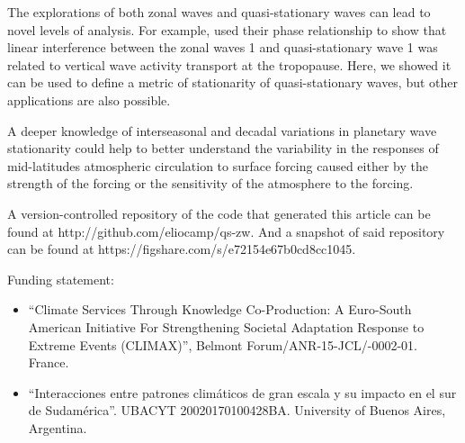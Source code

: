 \documentclass[draft,linenumbers]{agujournal2018}
\begin{document}
The explorations of both zonal waves and quasi-stationary waves can lead
to novel levels of analysis. For example, \citet{smith2012} used their
phase relationship to show that linear interference between the zonal
waves 1 and quasi-stationary wave 1 was related to vertical wave
activity transport at the tropopause. Here, we showed it can be used to
define a metric of stationarity of quasi-stationary waves, but other
applications are also possible.

A deeper knowledge of interseasonal and decadal variations in planetary
wave stationarity could help to better understand the variability in the
responses of mid-latitudes atmospheric circulation to surface forcing
caused either by the strength of the forcing or the sensitivity of the
atmosphere to the forcing.

\acknowledgments

A version-controlled repository of the code that generated this article
can be found at http://github.com/eliocamp/qs-zw. And a snapshot of said
repository can be found at https://figshare.com/s/e72154e67b0cd8cc1045.

Funding statement:

\begin{itemize}
\item
  ``Climate Services Through Knowledge Co-Production: A Euro-South
  American Initiative For Strengthening Societal Adaptation Response to
  Extreme Events (CLIMAX)'', Belmont Forum/ANR-15-JCL/-0002-01. France.
\item
  ``Interacciones entre patrones climáticos de gran escala y su impacto
  en el sur de Sudamérica''. UBACYT 20020170100428BA. University of
  Buenos Aires, Argentina.
\end{itemize}


\end{document}
